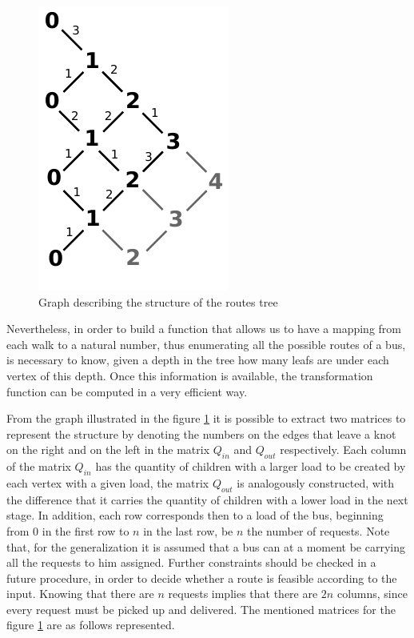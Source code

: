\documentclass[tuberlin,cic,tc,openright,english,noabntcite,oneside]{iiufrgs}
\begin{document}
\begin{figure}[H]
    \caption{Graph describing the structure of the routes tree}
    \begin{center}
        \includegraphics{fig_load_bus_scheme}
    \end{center}
    \label{fig:load_bus_scheme}
\end{figure}

Nevertheless, in order to build a function that allows us to have a mapping from each walk to a natural number, thus enumerating all the possible routes of a bus, is necessary to know, given a depth in the tree how many leafs are under each vertex of this depth. Once this information is available, the transformation function can be computed in a very efficient way.

From the graph illustrated in the figure \ref{fig:load_bus_scheme} it is possible to extract two matrices to represent the structure by denoting the numbers on the edges that leave a knot on the right and on the left in the matrix $Q_{in}$ and $Q_{out}$ respectively. Each column of the matrix $Q_{in}$ has the quantity of children with a larger load to be created by each vertex with a given load, the matrix $Q_{out}$ is analogously constructed, with the difference that it carries the quantity of children with a lower load in the next stage. In addition, each row corresponds then to a load of the bus, beginning from $0$ in the first row to $n$ in the last row, be $n$ the number of requests. Note that, for the generalization it is assumed that a bus can at a moment be carrying all the requests to him assigned. Further constraints should be checked in a future procedure, in order to decide whether a route is feasible according to the input. Knowing that there are $n$ requests implies that there are $2n$ columns, since every request must be picked up and delivered. The mentioned matrices for the figure \ref{fig:load_bus_scheme} are as follows represented.
\end{document}
